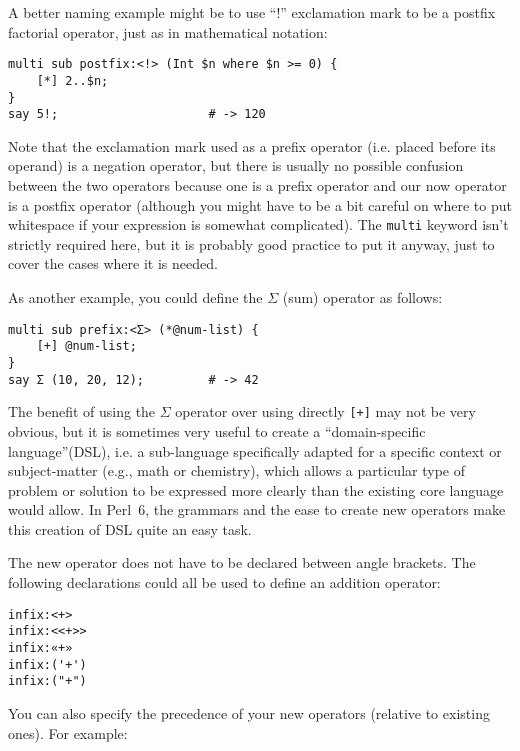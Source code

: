 A better naming example might be to use ``!'' exclamation 
mark to be a postfix factorial operator, just as in 
mathematical notation:

\begin{verbatim}
multi sub postfix:<!> (Int $n where $n >= 0) {
    [*] 2..$n;
}
say 5!;                     # -> 120
\end{verbatim}

Note that the exclamation mark used as a prefix 
operator (i.e. placed before its operand) is 
a negation operator, but there is usually no possible 
confusion between the two operators because one is a 
prefix operator and our now operator is a postfix operator 
(although you might have to be a bit careful on where 
to put whitespace if your expression is somewhat 
complicated). The {\tt multi} keyword isn't strictly 
required here, but it is probably good practice to 
put it anyway, just to cover the cases where it is 
needed. 

As another example, you could define the $\Sigma$ (sum) 
operator as follows:

\begin{verbatim}
multi sub prefix:<Σ> (*@num-list) {
    [+] @num-list;
}
say Σ (10, 20, 12);         # -> 42
\end{verbatim}

The benefit of using the $\Sigma$ operator over using 
directly \verb'[+]' may not be very obvious, but it is 
sometimes very useful to create a ``domain-specific 
language''(DSL), i.e. a sub-language specifically 
adapted for a specific context or subject-matter (e.g., math 
or chemistry), which allows a particular type of problem 
or solution to be expressed more clearly than the 
existing core language would allow. In Perl~6, the 
grammars and the ease to create new operators make 
this creation of DSL quite an easy task.


The new operator does not have to be declared between 
angle brackets. The following declarations could 
all be used to define an addition operator:

\begin{verbatim}
infix:<+>
infix:<<+>>
infix:«+»
infix:('+')
infix:("+")
\end{verbatim}

You can also specify the precedence of your new 
operators (relative to existing ones). For example:

